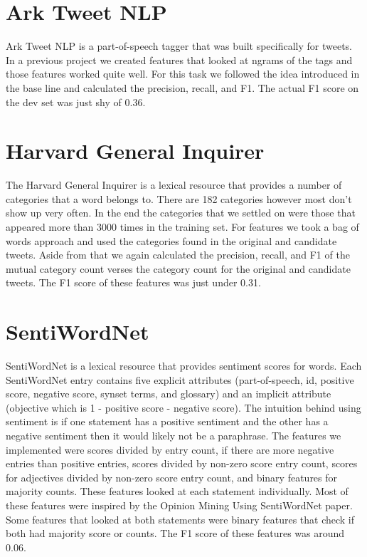 \documentclass[11pt,letterpaper]{article}
\begin{document}
\section{Ark Tweet NLP}
Ark Tweet NLP is a part-of-speech tagger that was built specifically for tweets. In a previous project we created features that looked at ngrams of the tags and those features worked quite well. For this task we followed the idea introduced in the base line and calculated the precision, recall, and F1. The actual F1 score on the dev set was just shy of 0.36.

\section{Harvard General Inquirer}
The Harvard General Inquirer is a lexical resource that provides a number of categories that a word belongs to. There are 182 categories however most don't show up very often. In the end the categories that we settled on were those that appeared more than 3000 times in the training set. For features we took a bag of words approach and used the categories found in the original and candidate tweets. Aside from that we again calculated the precision, recall, and F1 of the mutual category count verses the category count for the original and candidate tweets. The F1 score of these features was just under 0.31.

\section{SentiWordNet}
SentiWordNet is a lexical resource that provides sentiment scores for words. Each SentiWordNet entry contains five explicit attributes (part-of-speech, id, positive score, negative score, synset terms, and glossary) and an implicit attribute (objective which is 1 - positive score - negative score). The intuition behind using sentiment is if one statement has a positive sentiment and the other has a negative sentiment then it would likely not be a paraphrase. The features we implemented were scores divided by entry count, if there are more negative entries than positive entries, scores divided by non-zero score entry count, scores for adjectives divided by non-zero score entry count, and binary features for majority counts. These features looked at each statement individually. Most of these features were inspired by the Opinion Mining Using SentiWordNet paper. Some features that looked at both statements were binary features that check if both had majority score or counts. The F1 score of these features was around 0.06.
\end{document}
